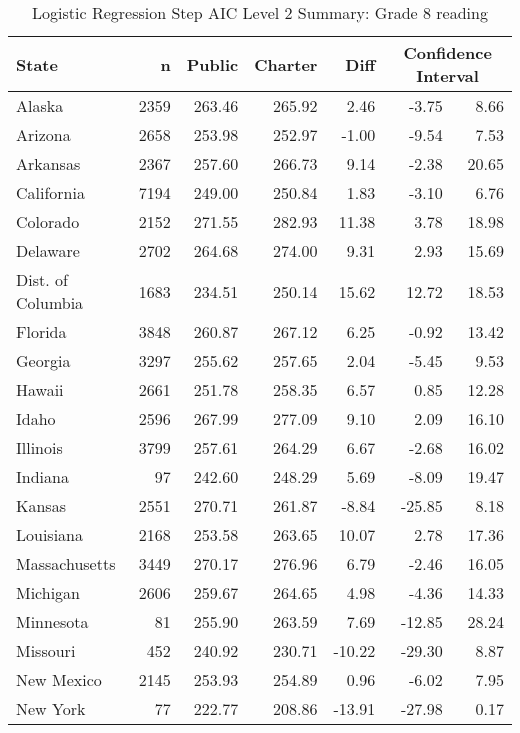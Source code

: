 \begin{table}[ht]
\begin{center}
\caption{Logistic Regression Step AIC Level 2 Summary: Grade 8 reading}
\label{g8readinglraiclevel2}
\begin{tabular}{lrrrrrr}
  \hline
  State & n & Public & Charter & Diff & \multicolumn{2}{c}{Confidence Interval} \\ \hline
Alaska & 2359 & 263.46 & 265.92 & 2.46 & -3.75 & 8.66 \\ 
  Arizona & 2658 & 253.98 & 252.97 & -1.00 & -9.54 & 7.53 \\ 
  Arkansas & 2367 & 257.60 & 266.73 & 9.14 & -2.38 & 20.65 \\ 
  California & 7194 & 249.00 & 250.84 & 1.83 & -3.10 & 6.76 \\ 
  Colorado & 2152 & 271.55 & 282.93 & 11.38 & 3.78 & 18.98 \\ 
  Delaware & 2702 & 264.68 & 274.00 & 9.31 & 2.93 & 15.69 \\ 
  Dist. of Columbia & 1683 & 234.51 & 250.14 & 15.62 & 12.72 & 18.53 \\ 
  Florida & 3848 & 260.87 & 267.12 & 6.25 & -0.92 & 13.42 \\ 
  Georgia & 3297 & 255.62 & 257.65 & 2.04 & -5.45 & 9.53 \\ 
  Hawaii & 2661 & 251.78 & 258.35 & 6.57 & 0.85 & 12.28 \\ 
  Idaho & 2596 & 267.99 & 277.09 & 9.10 & 2.09 & 16.10 \\ 
  Illinois & 3799 & 257.61 & 264.29 & 6.67 & -2.68 & 16.02 \\ 
  Indiana &  97 & 242.60 & 248.29 & 5.69 & -8.09 & 19.47 \\ 
  Kansas & 2551 & 270.71 & 261.87 & -8.84 & -25.85 & 8.18 \\ 
  Louisiana & 2168 & 253.58 & 263.65 & 10.07 & 2.78 & 17.36 \\ 
  Massachusetts & 3449 & 270.17 & 276.96 & 6.79 & -2.46 & 16.05 \\ 
  Michigan & 2606 & 259.67 & 264.65 & 4.98 & -4.36 & 14.33 \\ 
  Minnesota &  81 & 255.90 & 263.59 & 7.69 & -12.85 & 28.24 \\ 
  Missouri & 452 & 240.92 & 230.71 & -10.22 & -29.30 & 8.87 \\ 
  New Mexico & 2145 & 253.93 & 254.89 & 0.96 & -6.02 & 7.95 \\ 
  New York &  77 & 222.77 & 208.86 & -13.91 & -27.98 & 0.17 \\ 

\end{tabular}
\end{center}
\end{table}
